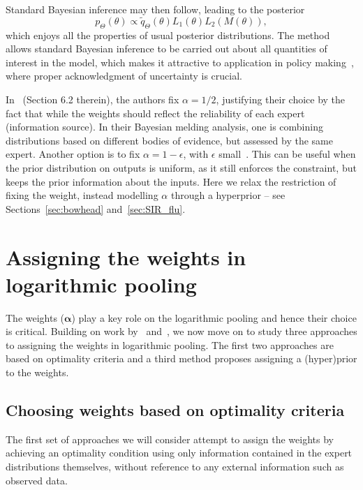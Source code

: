 \documentclass[12pt]{article}
\begin{document}
Standard Bayesian inference may then follow,  leading to the posterior
\begin{equation}
 \label{eq:BMpoolposterior}
 p_{\Theta}(\theta) \propto \tilde{q}_{\Theta}(\theta) L_1(\theta) L_2(M(\theta)),
\end{equation}
which enjoys all the properties of usual posterior distributions.
The method allows standard Bayesian inference to be carried out about all quantities of interest in the model, which makes it attractive to application in policy making~\parencite{Alkema2008}, where proper acknowledgment of uncertainty is crucial.

In~\textcite{Poole2000} (Section 6.2 therein), the authors fix $\alpha = 1/2$, justifying their choice by the fact that while the weights should reflect the reliability of each expert (information source).
In their Bayesian melding analysis, one is combining distributions based on different bodies of evidence, but assessed by the same expert.
Another option is to fix $\alpha = 1-\epsilon$, with $\epsilon$ small~\parencite{Alkema2007}.
This can be useful when the prior distribution on outputs is uniform, as it still enforces the constraint, but keeps the prior information about the inputs.
Here we relax the restriction of fixing the weight, instead modelling $\alpha$ through a hyperprior -- see Sections~\ref{sec:bowhead} and~\ref{sec:SIR_flu}. 

\section{Assigning the weights in logarithmic pooling}
\label{sec:weights}

The weights ($\boldsymbol \alpha$) play a key role on the logarithmic pooling and hence their choice is critical.
Building on work by~\textcite{Poole2000,Rufo2012A,Rufo2012B} and~\textcite{Abbas2009}, we now move on to study three approaches to assigning the weights in logarithmic pooling.
The first two approaches are based on optimality criteria and a third method proposes assigning a (hyper)prior to the weights.

\subsection{Choosing weights based on optimality criteria}

The first set of approaches we will consider attempt to assign the weights by achieving an optimality condition using only information contained in the expert distributions themselves, without reference to any external information such as observed data.
\end{document}
